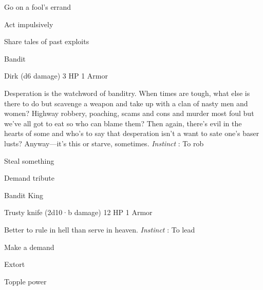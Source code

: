 \startitemize[1,packed]
         
\item Go on a fool's errand

         
\item Act impulsively

         
\item Share tales of past exploits

       
\stopitemize
       
\startMonsterName
Bandit	 
\stopMonsterName
       

Dirk (d6 damage)	3 HP	1 Armor

       


       
\startMonsterDescription
Desperation is the watchword of banditry. When times are tough, what else is there to do but scavenge a weapon and take up with a clan of nasty men and women? Highway robbery, poaching, scams and cons and murder most foul but we’ve all got to eat so who can blame them? Then again, there’s evil in the hearts of some and who’s to say that desperation isn’t a want to sate one’s baser lusts? Anyway—it’s this or starve, sometimes. {\em Instinct} : To rob
\stopMonsterDescription
       
\startitemize[1,packed]
         
\item Steal something

         
\item Demand tribute

       
\stopitemize
       
\startMonsterName
Bandit King	 
\stopMonsterName
       

Trusty knife (2d10·b damage)	12 HP	1 Armor

       


       
\startMonsterDescription
Better to rule in hell than serve in heaven. {\em Instinct} : To lead
\stopMonsterDescription
       
\startitemize[1,packed]
         
\item Make a demand

         
\item Extort

         
\item Topple power

